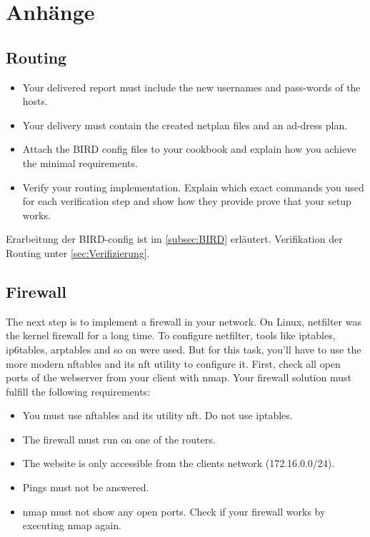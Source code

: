 \documentclass[11pt,titlepage]{article}
\newenvironment{shadedquotation}
 {\begin{shaded*}
  \quoting[leftmargin=0pt, vskip=0pt]
 }
 {\endquoting
 \end{shaded*}
}
\begin{document}
\section{Anhänge}
\label{sec:Anhänge}

\subsection{Routing}
\label{subsec:Routing}
\begin{shadedquotation}
  \begin{itemize}
    \item Your delivered report must include the new usernames and pass-words of the hosts.
    \item Your delivery must contain the created netplan files and an ad-dress plan.
    \item Attach the BIRD config files to your cookbook and explain how you achieve the minimal requirements.
    \item Verify your routing implementation. Explain which exact commands you used for each verification step and show how they provide prove that your setup works.
  \end{itemize}
\end{shadedquotation}
Erarbeitung der BIRD-config ist im \ref{subsec:BIRD} erläutert.
Verifikation der Routing unter \ref{sec:Verifizierung}.

\subsection{Firewall}
\label{subsec:Firewall}
\begin{shadedquotation}
	The next step is to implement a firewall in your network. On Linux, netfilter was the kernel
	firewall for a long time. To configure netfilter, tools like iptables, ip6tables, arptables and so
	on were used. But for this task, you’ll have to use the more modern nftables and its nft utility
	to configure it.
	First, check all open ports of the webserver from your client with nmap. Your firewall solution
	must fulfill the following requirements:
	\begin{itemize}
		\item You must use nftables and its utility nft. Do not use iptables.
		\item The firewall must run on one of the routers.
		\item The website is only accessible from the clients network (172.16.0.0/24).
		\item Pings must not be answered.
		\item nmap must not show any open ports.
		Check if your firewall works by executing nmap again.
	\end{itemize}
\end{shadedquotation}
\end{document}

